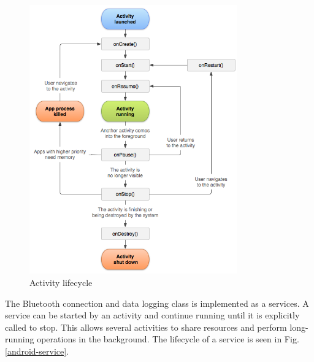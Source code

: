 \begin{figure}[H]
\centering
\includegraphics[width=0.8\textwidth]{Figures/activity_lifecycle.png}
\caption{Activity lifecycle}
\label{android-activity}
\end{figure}
The Bluetooth connection and data logging class is implemented as a services\cite{android-service}. A service can be started by an activity and continue running until it is explicitly called to stop. This allows several activities to share resources and perform long-running operations in the background. The lifecycle
of a service is seen in Fig. \ref{android-service}.

